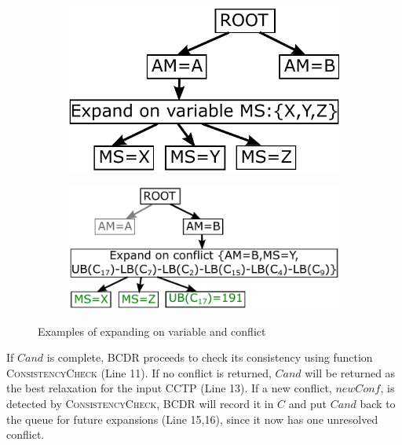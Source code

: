 \documentclass[jair,twoside,11pt,theapa]{article}
\begin{document}
\begin{figure}[h!]
	\centering
	\begin{subfigure}[b]{0.38\textwidth}
		\includegraphics[width=\textwidth]{figures/expand_on_variable.pdf}
		\caption{}
		\label{fig:ExpandOnVariable}
	\end{subfigure}
	\hspace{1cm}
	\begin{subfigure}[b]{0.52\textwidth}
		\includegraphics[width=\textwidth]{figures/expand_on_conflict.pdf}
		\caption{}
		\label{fig:ExpandOnConflict}
	\end{subfigure}
	\caption{Examples of expanding on variable and conflict}
\end{figure} 



If $\mathit{Cand}$ is complete, BCDR proceeds to check its consistency using function
\textsc{ConsistencyCheck} (Line 11). If no conflict is returned, $\mathit{Cand}$ will be
returned as the best relaxation for the input CCTP (Line 13). If a new conflict,
$\mathit{newConf}$, is detected by \textsc{ConsistencyCheck}, BCDR will record it in $C$
and put $\mathit{Cand}$ back to the queue for future expansions (Line 15,16), since it
now has one unresolved conflict.
\end{document}
